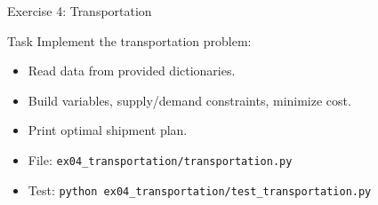 \documentclass[aspectratio=169,10pt]{beamer}
\begin{document}
\begin{frame}{Exercise 4: Transportation}
\begin{block}{Task}
Implement the transportation problem:
\begin{itemize}
  \item Read data from provided dictionaries.
  \item Build variables, supply/demand constraints, minimize cost.
  \item Print optimal shipment plan.
\end{itemize}
\end{block}
\begin{itemize}
  \item File: \texttt{ex04\_transportation/transportation.py}
  \item Test: \texttt{python ex04\_transportation/test\_transportation.py}
\end{itemize}
\end{frame}
\end{document}
